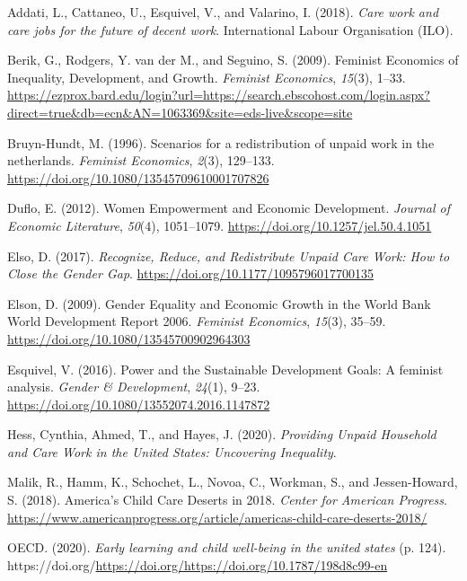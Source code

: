 \documentclass[
  11pt,
]{article}
\newlength{\cslhangindent}
\newenvironment{CSLReferences}[2] %
 {\begin{list}{}{%
  \setlength{\itemindent}{0pt}
  \setlength{\leftmargin}{0pt}
  \setlength{\parsep}{0pt}
  \ifodd #1
   \setlength{\leftmargin}{\cslhangindent}
   \setlength{\itemindent}{-1\cslhangindent}
  \fi
  \setlength{\itemsep}{#2\baselineskip}}}
 {\end{list}}
\begin{document}
\label{refs}
\begin{CSLReferences}{1}{0}
Addati, L., Cattaneo, U., Esquivel, V., and Valarino, I. (2018).
\emph{Care work and care jobs for the future of decent work}.
International Labour Organisation (ILO).

Berik, G., Rodgers, Y. van der M., and Seguino, S. (2009). Feminist
{Economics} of {Inequality}, {Development}, and {Growth}. \emph{Feminist
Economics}, \emph{15}(3), 1--33.
\url{https://ezprox.bard.edu/login?url=https://search.ebscohost.com/login.aspx?direct=true&db=ecn&AN=1063369&site=eds-live&scope=site}

Bruyn-Hundt, M. (1996). Scenarios for a redistribution of unpaid work in
the netherlands. \emph{Feminist Economics}, \emph{2}(3), 129--133.
\url{https://doi.org/10.1080/13545709610001707826}

Duflo, E. (2012). Women {Empowerment} and {Economic} {Development}.
\emph{Journal of Economic Literature}, \emph{50}(4), 1051--1079.
\url{https://doi.org/10.1257/jel.50.4.1051}

Elso, D. (2017). \emph{Recognize, {Reduce}, and {Redistribute} {Unpaid}
{Care} {Work}: {How} to {Close} the {Gender} {Gap}}.
\url{https://doi.org/10.1177/1095796017700135}

Elson, D. (2009). Gender {Equality} and {Economic} {Growth} in the
{World} {Bank} {World} {Development} {Report} 2006. \emph{Feminist
Economics}, \emph{15}(3), 35--59.
\url{https://doi.org/10.1080/13545700902964303}

Esquivel, V. (2016). Power and the {Sustainable} {Development} {Goals}:
A feminist analysis. \emph{Gender \& Development}, \emph{24}(1), 9--23.
\url{https://doi.org/10.1080/13552074.2016.1147872}

Hess, Cynthia, Ahmed, T., and Hayes, J. (2020). \emph{Providing {Unpaid}
{Household} and {Care} {Work} in the {United} {States}: {Uncovering}
{Inequality}}.

Malik, R., Hamm, K., Schochet, L., Novoa, C., Workman, S., and
Jessen-Howard, S. (2018). America's {Child} {Care} {Deserts} in 2018.
\emph{Center for American Progress}.
\url{https://www.americanprogress.org/article/americas-child-care-deserts-2018/}

OECD. (2020). \emph{Early learning and child well-being in the united
states} (p. 124).
https://doi.org/\url{https://doi.org/https://doi.org/10.1787/198d8c99-en}

\end{CSLReferences}
\end{document}

